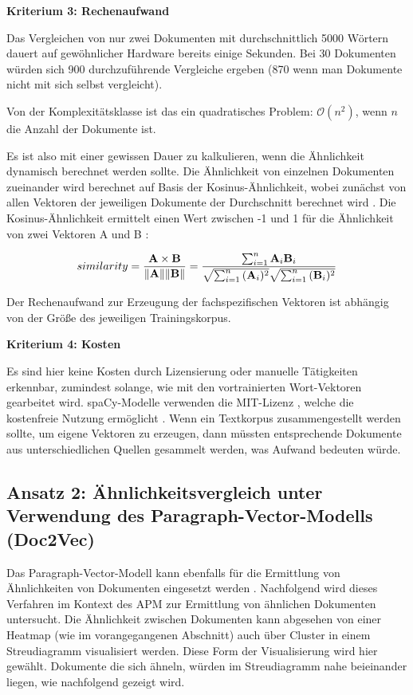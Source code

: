 {\bf Kriterium 3: Rechenaufwand}

Das Vergleichen von nur zwei Dokumenten mit durchschnittlich 5000 Wörtern dauert auf gewöhnlicher Hardware bereits einige Sekunden. Bei 30 Dokumenten würden sich 900 durchzuführende Vergleiche ergeben (870 wenn man Dokumente nicht mit sich selbst vergleicht). 

Von der Komplexitätsklasse ist das ein quadratisches Problem: 
$\mathcal{O}(n^2)$, wenn $n$ die Anzahl der Dokumente ist. 

Es ist also mit einer gewissen Dauer zu kalkulieren, wenn die Ähnlichkeit dynamisch berechnet werden sollte. Die Ähnlichkeit von einzelnen Dokumenten zueinander wird berechnet auf Basis der Kosinus-Ähnlichkeit, wobei zunächst von allen Vektoren der jeweiligen Dokumente der Durchschnitt berechnet wird \cite{spacy3}. Die Kosinus-Ähnlichkeit ermittelt einen Wert zwischen -1 und 1 für die Ähnlichkeit von zwei Vektoren A und B \cite[S. 84]{Gupta}:	
 
 \begin{equation}
similarity = {{\bf A} \times {\bf B} \over \|{\bf A}\| \|{\bf B}\|} = \frac{ \sum_{i=1}^{n}{{\bf A}_i{\bf B}_i} }{ \sqrt{\sum_{i=1}^{n}{({\bf A}_i)^2}} \sqrt{\sum_{i=1}^{n}{({\bf B}_i)^2}} }
\end{equation}

Der Rechenaufwand zur Erzeugung der fachspezifischen Vektoren ist abhängig von der Größe des jeweiligen Trainingskorpus. 

{\bf Kriterium 4: Kosten}

Es sind hier keine Kosten durch Lizensierung oder manuelle Tätigkeiten erkennbar, zumindest solange, wie mit den vortrainierten Wort-Vektoren gearbeitet wird. spaCy-Modelle verwenden die MIT-Lizenz \cite{spacy-license}, welche die kostenfreie Nutzung ermöglicht \cite{MIT}. Wenn ein Textkorpus zusammengestellt werden sollte, um eigene Vektoren zu erzeugen, dann müssten entsprechende Dokumente aus unterschiedlichen Quellen gesammelt werden, was Aufwand bedeuten würde.


\subsection{Ansatz 2: Ähnlichkeitsvergleich unter Verwendung des Paragraph-Vector-Modells (Doc2Vec)}

Das Paragraph-Vector-Modell kann ebenfalls für die Ermittlung von Ähnlichkeiten von Dokumenten eingesetzt werden \cite{Dai}. Nachfolgend wird dieses Verfahren im Kontext des APM zur Ermittlung von ähnlichen Dokumenten untersucht. Die Ähnlichkeit zwischen Dokumenten kann abgesehen von einer Heatmap (wie im vorangegangenen Abschnitt) auch über Cluster in einem Streudiagramm visualisiert werden. Diese Form der Visualisierung wird hier gewählt. Dokumente die sich ähneln, würden im Streudiagramm nahe beieinander liegen, wie nachfolgend gezeigt wird. 

